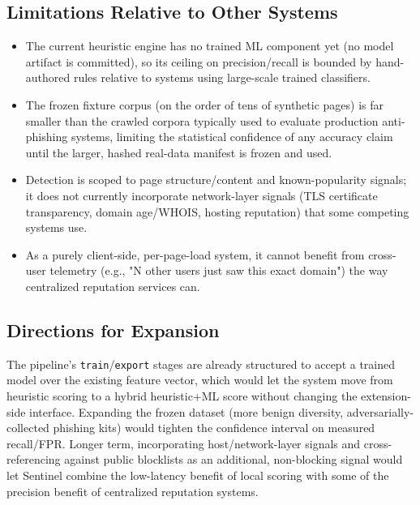 \documentclass[conference]{IEEEtran}
\begin{document}
\subsection{Limitations Relative to Other Systems}
\begin{itemize}
  \item The current heuristic engine has no trained ML component yet (no model artifact is committed), so its ceiling on precision/recall is bounded by hand-authored rules relative to systems using large-scale trained classifiers.
  \item The frozen fixture corpus (on the order of tens of synthetic pages) is far smaller than the crawled corpora typically used to evaluate production anti-phishing systems, limiting the statistical confidence of any accuracy claim until the larger, hashed real-data manifest is frozen and used.
  \item Detection is scoped to page structure/content and known-popularity signals; it does not currently incorporate network-layer signals (TLS certificate transparency, domain age/WHOIS, hosting reputation) that some competing systems use.
  \item As a purely client-side, per-page-load system, it cannot benefit from cross-user telemetry (e.g., "N other users just saw this exact domain") the way centralized reputation services can.
\end{itemize}

\subsection{Directions for Expansion}
The pipeline's \texttt{train}/\texttt{export} stages are already structured to accept a trained model over the existing feature vector, which would let the system move from heuristic scoring to a hybrid heuristic+ML score without changing the extension-side interface. Expanding the frozen dataset (more benign diversity, adversarially-collected phishing kits) would tighten the confidence interval on measured recall/FPR. Longer term, incorporating host/network-layer signals and cross-referencing against public blocklists as an additional, non-blocking signal would let Sentinel combine the low-latency benefit of local scoring with some of the precision benefit of centralized reputation systems.

\end{document}
